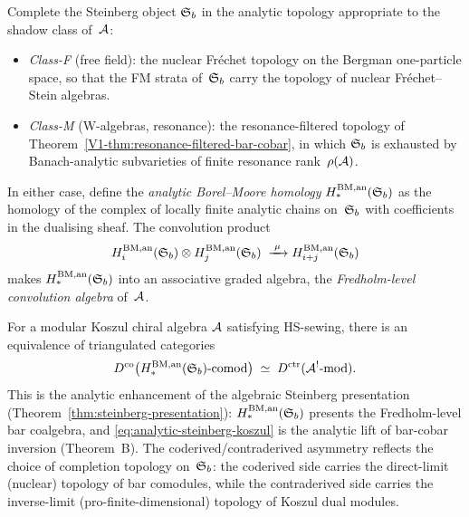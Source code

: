\begin{construction}%
%
%
Complete the Steinberg object $\mathfrak{S}_b$ in the analytic topology
appropriate to the shadow class of~$\mathcal{A}$:
\begin{itemize}
\item \emph{Class-F} (free field): the nuclear Fr\'echet topology
 on the Bergman one-particle space, so that the FM strata
 of~$\mathfrak{S}_b$ carry the topology of nuclear Fr\'echet--Stein
 algebras.
\item \emph{Class-M} (W-algebras, resonance): the
 resonance-filtered topology of
 Theorem~\ref{V1-thm:resonance-filtered-bar-cobar}, in which
 $\mathfrak{S}_b$ is exhausted by Banach-analytic subvarieties of
 finite resonance rank~$\rho(\mathcal{A})$.
\end{itemize}
In either case, define the \emph{analytic Borel--Moore homology}
$H_*^{\mathrm{BM,an}}(\mathfrak{S}_b)$ as the homology of the complex of
locally finite analytic chains on~$\mathfrak{S}_b$ with coefficients in
the dualising sheaf. The convolution product
\[
H_i^{\mathrm{BM,an}}(\mathfrak{S}_b)
\otimes
H_j^{\mathrm{BM,an}}(\mathfrak{S}_b)
\;\xrightarrow{\;\mu\;}
H_{i+j}^{\mathrm{BM,an}}(\mathfrak{S}_b)
\]
makes $H_*^{\mathrm{BM,an}}(\mathfrak{S}_b)$ into an associative graded
algebra, the \emph{Fredholm-level convolution algebra} of~$\mathcal{A}$.
\end{construction}

\begin{conjecture}[\ClaimStatusConjectured]%
%
%
%
For a modular Koszul chiral algebra $\mathcal{A}$ satisfying HS-sewing,
there is an equivalence of triangulated categories
\begin{equation}%
\codercat\bigl(H_*^{\mathrm{BM,an}}(\fSb)\textup{-comod}\bigr)
\;\simeq\;
\contrcat(\cA^!\textup{-mod}).
\end{equation}
This is the analytic enhancement of the algebraic Steinberg
presentation (Theorem~\ref{thm:steinberg-presentation}):
$H_*^{\mathrm{BM,an}}(\mathfrak{S}_b)$ presents the Fredholm-level
bar coalgebra, and
\eqref{eq:analytic-steinberg-koszul} is the analytic lift
of bar-cobar inversion (Theorem~B).
The coderived/contraderived asymmetry reflects the choice
of completion topology on~$\mathfrak{S}_b$: the coderived side
carries the direct-limit (nuclear) topology of bar comodules,
while the contraderived side carries the inverse-limit
(pro-finite-dimensional) topology of Koszul dual modules.
\end{conjecture}

